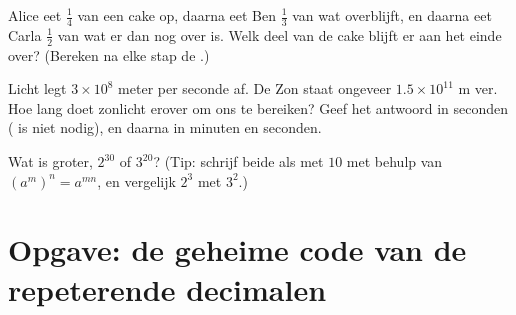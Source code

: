 \begin{exercise}[$\star\star$]\label{exo:g9:fractions:8}
Alice eet $\frac14$ van een cake op, daarna eet Ben $\frac13$ van wat overblijft,
en daarna eet Carla $\frac12$ van wat er dan nog over is. Welk deel van de cake
blijft er aan het einde over? (Bereken na elke stap de .)
\end{exercise}

\begin{exercise}[$\star\star$]\label{exo:g9:fractions:9}
Licht legt $3 \times 10^8$ meter per seconde af. De Zon staat ongeveer
$1.5 \times 10^{11}$ m ver. Hoe lang doet zonlicht erover om ons te bereiken? Geef
het antwoord in seconden ( is niet nodig), en daarna in
minuten en seconden.
\end{exercise}

\begin{exercise}[$\star\star\star$]\label{exo:g9:fractions:10}
Wat is groter, $2^{30}$ of $3^{20}$? (Tip: schrijf beide als  met 
$10$ met behulp van $\left(a^m\right)^n = a^{mn}$, en vergelijk $2^3$ met $3^2$.)
\end{exercise}

\section{Opgave: de geheime code van de repeterende decimalen}

